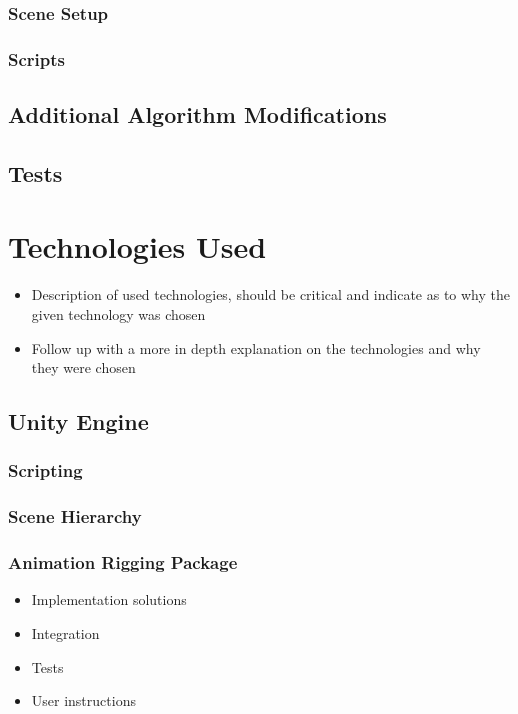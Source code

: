 \documentclass[a4paper, 12pt]{report} \linespread{1.3}
\begin{document}
\subsection{Scene Setup}
\subsection{Scripts}
\section{Additional Algorithm Modifications}
\section{Tests}

\chapter{Technologies Used}
\begin{itemize}
    \item Description of used technologies, should be critical and indicate as
        to why the given technology was chosen
    \item Follow up with a more in depth explanation on the technologies and why
        they were chosen
\end{itemize}

\section{Unity Engine}
\subsection{Scripting}
\subsection{Scene Hierarchy}
\subsection{Animation Rigging Package}
\begin{itemize}
    \item Implementation solutions
    \item Integration
    \item Tests
    \item User instructions
\end{itemize}
\end{document}
